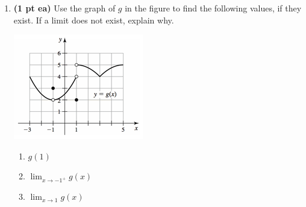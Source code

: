 \documentclass[12pt]{article}
\begin{document}
\begin{enumerate}

\newpage
\item {\bf (1 pt ea)} Use the graph of $g$ in the figure to find the following values, if they exist.  If a limit does not exist, explain why.

\begin{center}\includegraphics[scale=1.5]{exam1bsec2p2}\end{center}

\vspace{1pc}
\begin{multicols}{3}
\begin{enumerate}
	\item $g(1)$
	\vspace{2pc}
	
	\item $\lim_{x\to -1^+}g(x)$
	\vspace{2pc}
	
	\item $\lim_{x\to 1}g(x)$
	\vspace{2pc}
	

\end{enumerate}
\end{multicols}
\end{enumerate}
\end{document}
